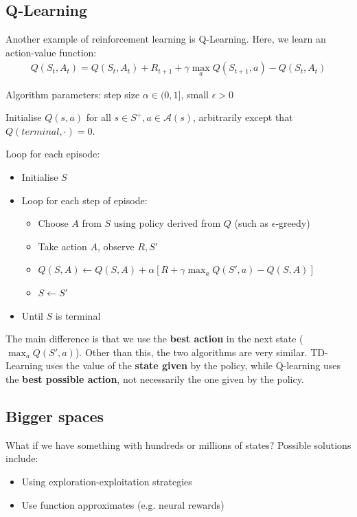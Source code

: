 \documentclass[11pt,a4paper,titlepage,dvipsnames,cmyk]{scrartcl}
\begin{document}
\subsection{Q-Learning}
Another example of reinforcement learning is Q-Learning. Here, we learn an action-value function:
\begin{align*}
Q(S_t,A_t) = Q(S_t,A_t) + R_{t+1} + \gamma \max_a Q(S_{t+1}, a) - Q(S_t,A_t)
\end{align*}

\begin{tcolorbox} [space to upper,
collower=white,
title={Q-Learning for estimating $\pi \simeq \pi$},
nobeforeafter,
halign lower=flush right, ]
Algorithm parameters: step size $\alpha \in (0,1]$, small $\epsilon > 0$

Initialise $Q(s,a)$ for all $s \in S^+, a \in \mathcal{A}(s)$, arbitrarily except that $Q(terminal,\cdot) = 0$.

Loop for each episode:
\begin{itemize}
    \item Initialise $S$
    \item Loop for each step of episode:
    \begin{itemize}
        \item Choose $A$ from $S$ using policy derived from $Q$ (such as $\epsilon$-greedy)
        \item Take action $A$, observe $R,S'$
        \item $Q(S,A) \leftarrow Q(S,A) + \alpha[R + \gamma \max_aQ(S', a) - Q(S,A)]$
        \item $S \leftarrow S'$
    \end{itemize}
    \item Until $S$ is terminal
\end{itemize}
\end{tcolorbox}

The main difference is that we use the \textbf{best action} in the next state ($\max_aQ(S',a)$). Other than this, the two algorithms are very similar. TD-Learning uses the value of the \textbf{state given} by the policy, while Q-learning uses the \textbf{best possible action}, not necessarily the one given by the policy.

\subsection{Bigger spaces}
What if we have something with hundreds or millions of states? Possible solutions include:
\begin{itemize}
    \item Using exploration-exploitation strategies
    \item Use function approximates (e.g. neural rewards)
\end{itemize}
\end{document}
